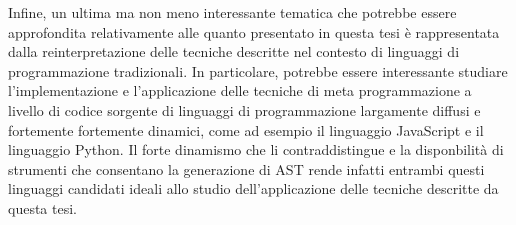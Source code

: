 \documentclass{book}
\begin{document}
Infine, un ultima ma non meno interessante tematica che potrebbe essere
approfondita relativamente alle quanto presentato in questa tesi è rappresentata
dalla reinterpretazione delle tecniche descritte nel contesto di linguaggi di
programmazione tradizionali. In particolare, potrebbe essere interessante
studiare l'implementazione e l'applicazione delle tecniche di meta
programmazione a livello di codice sorgente di linguaggi di programmazione
largamente diffusi e fortemente fortemente dinamici, come ad esempio il
linguaggio JavaScript e il linguaggio Python. Il forte dinamismo che li
contraddistingue e la disponbilità di strumenti che consentano la generazione di
AST rende infatti entrambi questi linguaggi candidati ideali allo studio
dell'applicazione delle tecniche descritte da questa tesi.

\printbibliography[filter=papers,title={Articoli Citati}]
\printbibliography[type=book,title={Bibliografia}]
\printbibliography[type=misc,title={Sitografia}]
\end{document}
